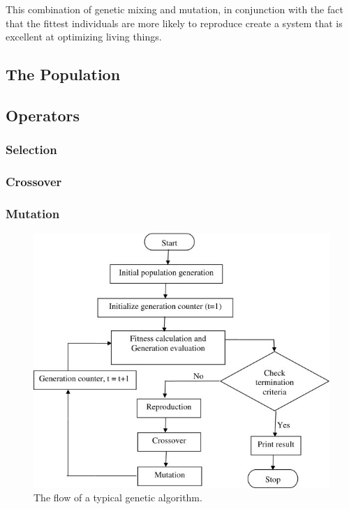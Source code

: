 This combination of genetic mixing and mutation, in conjunction with the fact that the fittest individuals are more likely to reproduce create a system that is excellent at optimizing living things. 
  

\subsection{The Population}


\subsection{Operators}


\subsubsection{Selection}


\subsubsection{Crossover}


\subsubsection{Mutation}



\begin{figure}[!htb]
	\begin{center}
		\includegraphics[scale=.75]{images/genetic_typical.png}
	\end{center}
	\caption{The flow of a typical genetic algorithm.}
	\label{logo}
\end{figure}

